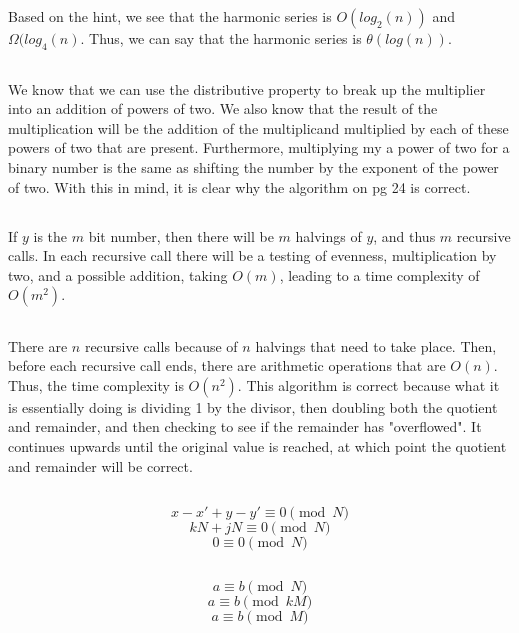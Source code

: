 \documentclass{article}
\begin{document}
\subsection{}Based on the hint, we see that the harmonic series is $O(log_2(n))$ and $\Omega(log_4(n)$. Thus, we can say that the harmonic series is $\theta(log(n))$.
\subsection{}We know that we can use the distributive property to break up the multiplier into an addition of powers of two. We also know that the result of the multiplication will be the addition of the multiplicand multiplied by each of these powers of two that are present. Furthermore, multiplying my a power of two for a binary number is the same as shifting the number by the exponent of the power of two. With this in mind, it is clear why the algorithm on pg 24 is correct. 
\subsection{}If $y$ is the $m$ bit number, then there will be $m$ halvings of $y$, and thus $m$ recursive calls. In each recursive call there will be a testing of evenness, multiplication by two, and a possible addition, taking $O(m)$, leading to a time complexity of $O(m^2)$.
\subsection{}There are $n$ recursive calls because of $n$ halvings that need to take place. Then, before each recursive call ends, there are arithmetic operations that are $O(n)$. Thus, the time complexity is $O(n^2)$. This algorithm is correct because what it is essentially doing is dividing 1 by the divisor, then doubling both the quotient and remainder, and then checking to see if the remainder has "overflowed". It continues upwards until the original value is reached, at which point the quotient and remainder will be correct. 
\subsection{}$$x - x' + y - y' \equiv 0 \pmod N$$
$$kN+jN \equiv 0 \pmod N$$
$$0 \equiv 0 \pmod N$$
\subsection{}$$a \equiv b \pmod N$$
$$a \equiv b \pmod {kM}$$
$$a \equiv b \pmod M$$
\end{document}
